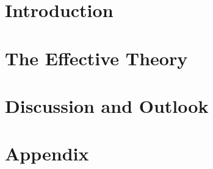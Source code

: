 \documentclass[%
  12pt,%
  twoside,%
  openright,%
  cleardoublepage=empty%
]{scrreprt}
\begin{document}
\cleardoublepage
{}


\part{Introduction}
\cleardoublepage

\cleardoublepage

\cleardoublepage



\cleardoublepage
\part{The Effective Theory}
\cleardoublepage

\cleardoublepage



\cleardoublepage
\part{Discussion and Outlook}
\cleardoublepage

\cleardoublepage



\cleardoublepage
\appendix
\part{Appendix}
\cleardoublepage

\cleardoublepage



\cleardoublepage



\cleardoublepage

\end{document}
